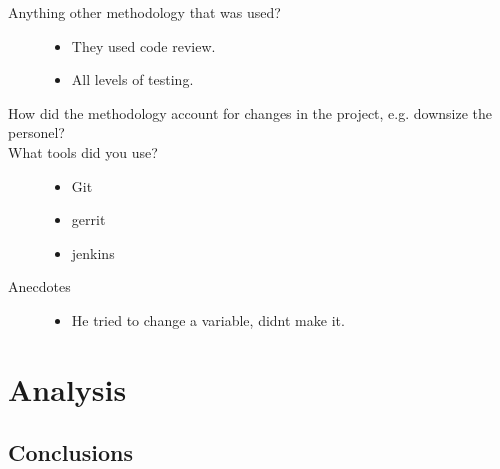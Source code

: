 \documentclass{article}
\begin{document}
\begin{description}
\item[Anything other methodology that was used?]
  \begin{itemize}
  \item They used code review.
  \item All levels of testing.
  \end{itemize}
\item[How did the methodology account for changes in the project,
  e.g. downsize the personel?]
\item[What tools did you use?]
  \begin{itemize}
  \item Git
  \item gerrit
  \item jenkins
  \end{itemize}
\item[Anecdotes]
  \begin{itemize}
  \item He tried to change a variable, didnt make it.
  \end{itemize}
\end{description}

\section{Analysis}

\subsection{Conclusions}
\end{document}
